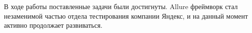 \startconclusionpage

В ходе работы поставленные задачи были достигнуты. Allure фреймворк стал незаменимой частью отдела тестирования компании Яндекс, и на данный момент активно продолжает развиваться.
